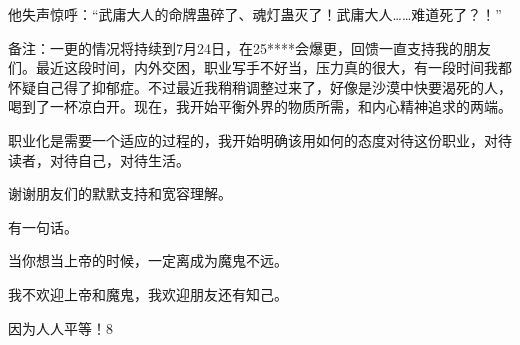 \begin{this_body}
他失声惊呼：“武庸大人的命牌蛊碎了、魂灯蛊灭了！武庸大人……难道死了？！”

备注：一更的情况将持续到7月24日，在25****会爆更，回馈一直支持我的朋友们。最近这段时间，内外交困，职业写手不好当，压力真的很大，有一段时间我都怀疑自己得了抑郁症。不过最近我稍稍调整过来了，好像是沙漠中快要渴死的人，喝到了一杯凉白开。现在，我开始平衡外界的物质所需，和内心精神追求的两端。

职业化是需要一个适应的过程的，我开始明确该用如何的态度对待这份职业，对待读者，对待自己，对待生活。

谢谢朋友们的默默支持和宽容理解。

有一句话。

当你想当上帝的时候，一定离成为魔鬼不远。

我不欢迎上帝和魔鬼，我欢迎朋友还有知己。

因为人人平等！8

\end{this_body}

